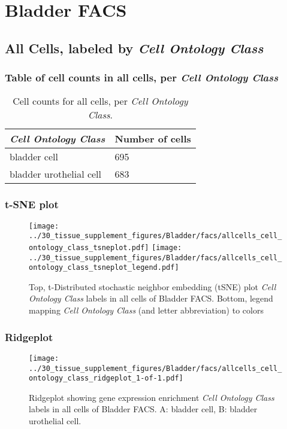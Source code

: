 \clearpage
\section{Bladder FACS}

\subsection{All Cells, labeled by \emph{Cell Ontology Class}}
\subsubsection{Table of cell counts in all cells, per \emph{Cell Ontology Class}}\begin{table}[h]
\centering
\label{my-label}
\begin{tabular}{@{}ll@{}}
\toprule

\emph{Cell Ontology Class}& Number of cells \\ \midrule
bladder cell & 695 \\

bladder urothelial cell & 683 \\
\bottomrule
\end{tabular}
\caption{Cell counts for all cells, per \emph{Cell Ontology Class}.}
\end{table}

\clearpage
\subsubsection{t-SNE plot}
\begin{figure}[h]
\centering
\texttt{[image: ../30\_tissue\_supplement\_figures/Bladder/facs/allcells\_cell\_ontology\_class\_tsneplot.pdf]}
\texttt{[image: ../30\_tissue\_supplement\_figures/Bladder/facs/allcells\_cell\_ontology\_class\_tsneplot\_legend.pdf]}
\caption{Top, t-Distributed stochastic neighbor embedding (tSNE) plot  \emph{Cell Ontology Class} labels in all cells of Bladder FACS. Bottom, legend mapping \emph{Cell Ontology Class} (and letter abbreviation) to colors}
\end{figure}


\clearpage

\subsubsection{Ridgeplot}
\begin{figure}[h]
\centering
\texttt{[image: ../30\_tissue\_supplement\_figures/Bladder/facs/allcells\_cell\_ontology\_class\_ridgeplot\_1-of-1.pdf]}

\caption{ Ridgeplot  showing gene expression enrichment \emph{Cell Ontology Class} labels in all cells of Bladder FACS. A: bladder cell, B: bladder urothelial cell.}
\end{figure}


